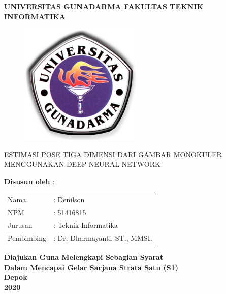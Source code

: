 \newpage


\begin{center}

\bfseries
 {\Huge UNIVERSITAS GUNADARMA}
 \vspace{1.0cm}
 {\Large FAKULTAS TEKNIK INFORMATIKA}%
\vspace{0.2cm}

\begin{figure}[h]
  \begin{center}
    \includegraphics[scale=4]{gambar/LogoGunadarma.jpg}
  \end{center}
\end{figure}
 
{\large ESTIMASI POSE TIGA DIMENSI DARI GAMBAR MONOKULER MENGGUNAKAN DEEP NEURAL NETWORK}

\end{center}
\vspace{0.5cm}

\begin{center}
\bfseries
{Disusun oleh $:$}

\vspace{0.5cm}

\begin{tabular}{ll}
Nama& : Denilson\tabularnewline 
NPM& : 51416815\tabularnewline 
Jurusan& : Teknik Informatika\tabularnewline
Pembimbing& : Dr. Dharmayanti, ST., MMSI.\tabularnewline
\end{tabular}
\end{center}

\vspace{2.0cm}
\begin{center}
\bfseries
Diajukan Guna Melengkapi Sebagian Syarat \\
Dalam Mencapai Gelar Sarjana Strata Satu (S1)\\

Depok\\
2020 %

\end{center}
